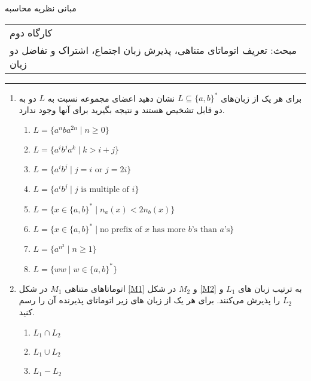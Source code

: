 \documentclass{article}
\begin{document}
	\begin{center}
		\Huge
		مبانی نظریه محاسبه
	\end{center}
	\Large
	\begin{tabularx}{\linewidth}{>{\raggedleft\arraybackslash}X}
		کارگاه دوم
		\\
		مبحث: تعریف اتوماتای متناهی، پذیرش زبان اجتماع، اشتراک و تفاضل دو زبان
		\\
		
	\end{tabularx}
	\rule{\textwidth}{1pt}
	\large
	\begin{enumerate}
		\item 
		برای هر یک از زبان‌های
		$L \subseteq \{a, b\}^*$
		نشان دهید اعضای مجموعه 
		نسبت به $L$ دو به دو قابل تشخیص
		هستند و نتیجه بگیرید 
		برای آنها وجود ندارد.
		\begin{latin}
			\begin{enumerate}
				\item $L = \{a^nba^{2n} \; | \; n \geq 0\}$
				\item $L = \{a^ib^ja^k \; | \; k >  i + j \}$
				\item $L = \{a^ib^j \; | \; \text{$j = i$ or $j = 2i$}\}$
				\item $L = \{a^ib^j \; | \; \text{$j$ is multiple of $i$}\}$
				\item $L = \{x \in \{a,b\}^* \; | \; n_a(x) < 2n_b(x) \}$
				\item $L = \{x \in \{a,b\}^* \; | \; \text{no prefix of $x$ has more $b$'s than $a$'s} \}$
				\item $L = \{a^{n^3} \; | \;  n \geq 1\}$
				\item $L = \{ww \; | \;  w \in \{a,b\}^*\}$
			\end{enumerate}
		\end{latin}
		
		\item 
		اتوماتاهای متناهی $ M_1 $ در شکل \ref{M1} و $ M_2 $ در شکل \ref{M2} به ترتیب زبان های $L_1$  و $L_2$ را پذیرش
		می‌کنند. برای هر یک از زبان های زیر اتوماتای پذیرنده آن را رسم کنید.
		
		
		
		\begin{enumerate}
			\item 
			$L_1 \cap L_2$
			\item 
			$L_1 \cup L_2$
			\item
			$L_1 - L_2$
		\end{enumerate}
		

\end{enumerate}
\end{document}
